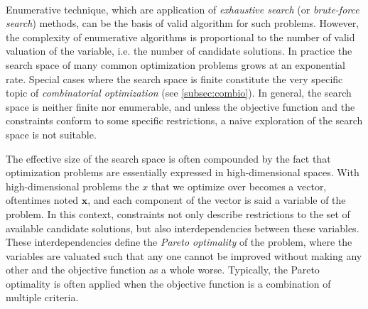 	\paragraph{}
	Enumerative technique, which are application of \emph{exhaustive search} (or \emph{brute-force search}) methods, can be the basis of valid algorithm for such problems. %
	However, the complexity of enumerative algorithms is proportional to the number of valid valuation of the variable, i.e. the number of candidate solutions. %
	In practice the search space of many common optimization problems grows at an exponential rate.
	Special cases where the search space is finite constitute the very specific topic of \emph{combinatorial optimization} (see \cref{subsec:combio}).
	In general, the search space is neither finite nor enumerable, and unless the objective function and the constraints conform to some specific restrictions, a naive exploration of the search space is not suitable. %

	The effective size of the search space is often compounded by the fact that optimization problems are essentially expressed in high-dimensional spaces.
	With high-dimensional problems the $x$ that we optimize over becomes a vector, oftentimes noted $\mathbf{x}$, and each component of the vector is said a variable of the problem.
	In this context, constraints not only describe restrictions to the set of available candidate solutions, but also interdependencies between these variables.
	These interdependencies define the \emph{Pareto optimality} of the problem, where the variables are valuated such that any one cannot be improved without making any other and the objective function as a whole worse.
	Typically, the Pareto optimality is often applied when the objective function is a combination of multiple criteria.

